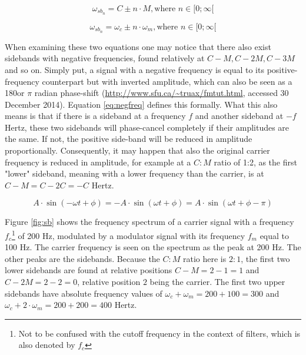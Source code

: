 \documentclass[12pt,twoside]{report}
\begin{document}
\begin{equation}
  \omega_{{sb}_{n}} = C \pm n \cdot M, \text{where } n \in [0;\infty[
  \label{eq:sbcm}
\end{equation}

\begin{equation}
  \omega_{{sb}_{n}} = \omega_{c} \pm n \cdot \omega_{m}, \text{where } n \in [0;\infty[
  \label{eq:sbabs}
\end{equation}

\noindent When examining these two equations one may notice that there also exist sidebands with negative frequencies, found relatively at $C - M, C - 2M, C - 3M$ and so on. Simply put, a signal with a negative frequency is equal to its positive-frequency counterpart but with inverted amplitude, which can also be seen as a 180\degree or $\pi$ radian phase-shift (\url{http://www.sfu.ca/~truax/fmtut.html}, accessed 30 December 2014). Equation \ref{eq:negfreq} defines this formally. What this also means is that if there is a sideband at a frequency $f$ and another sideband at $-f$ Hertz, these two sidebands will phase-cancel completely if their amplitudes are the same. If not, the positive side-band will be reduced in amplitude proportionally. Consequently, it may happen that also the original carrier frequency is reduced in amplitude, for example at a $C:M$ ratio of 1:2, as the first "lower" sideband, meaning with a lower frequency than the carrier, is at $C - M = C - 2C = -C$ Hertz.

\begin{equation}
  A \cdot \sin(-\omega t + \phi) = -A \cdot \sin(\omega t + \phi) = A \cdot \sin(\omega t + \phi - \pi)
  \label{eq:negfreq}
\end{equation}

\noindent Figure \ref{fig:sb} shows the frequency spectrum of a carrier signal with a frequency $f_{c}$\footnote{Not to be confused with the cutoff frequency in the context of filters, which is also denoted by $f_{c}$} of 200 Hz, modulated by a modulator signal with its frequency $f_{m}$ equal to 100 Hz. The carrier frequency is seen on the spectrum as the peak at 200 Hz. The other peaks are the sidebands. Because the $C:M$ ratio here is $2:1$, the first two lower sidebands are found at relative positions $C-M=2-1=1$ and $C-2M=2-2=0$, relative position $2$ being the carrier. The first two upper sidebands have absolute frequency values of $\omega_{c} + \omega_{m} = 200 + 100 = 300$ and %
$\omega_{c} +2\cdot\omega_{m} = 200 + 200 = 400$ Hertz.\\
\end{document}
